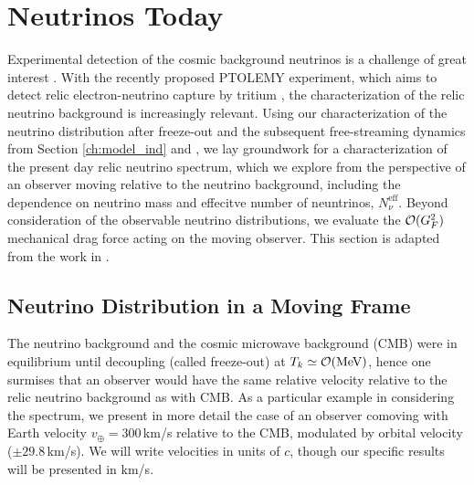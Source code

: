 \section{Neutrinos Today}\label{ch:nu_today}
Experimental detection of the cosmic background neutrinos is a challenge of great interest \cite{Stodolsky:1975,Cabibbo:1982,Shvartsman,Langacker:1982,Smith,Ferreras:1995wf,Hagmann:1999kf,Duda:2001hd,Gelmini,Ringwald:2009,Liao:2012,Hedman}. With the  recently proposed PTOLEMY experiment, which aims to detect relic  electron-neutrino capture by tritium \cite{PTOLEMY}, the characterization of the relic neutrino background is increasingly relevant.  Using our  characterization of the neutrino distribution after freeze-out and the subsequent free-streaming dynamics from Section  \ref{ch:model_ind} and \cite{Birrell:2013_2}, we lay groundwork for a characterization of the present day relic neutrino spectrum, which we explore  from the  perspective of an observer moving relative to the neutrino background, including the dependence on neutrino mass and effecitve number of neuntrinos, $N_\nu^{\mathrm{eff}}$. Beyond consideration of the observable neutrino distributions, we evaluate the ${\cal O}(G_F^2)$ mechanical drag force acting on the moving observer. This section is adapted from the work in \cite{Birrell:2014qna}.




\subsection{Neutrino Distribution in a Moving Frame}

The neutrino background and the cosmic microwave background (CMB) were in equilibrium until decoupling (called freeze-out) at $T_k\simeq {\cal O}{\rm (MeV)}$, hence one surmises that an observer would have the same relative velocity relative to the relic neutrino background  as with CMB. As a particular example in considering the spectrum, we present in more detail the case of an observer comoving with  Earth velocity $v_\oplus=300$\,km/s relative to the CMB,  modulated by orbital velocity ($\pm29.8$\,km/s).  We will write velocities in units of $c$, though our specific results will be presented in km/s.


